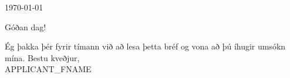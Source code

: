 \documentclass[
    10pt, %
    a4paper, %
    oneside, %
    footinclude, %
    BCOR5mm, %
]{scrartcl}
\title{\normalfont\fontsize{18}{10}\selectfont \spacedlowsmallcaps{LETTER_TITLE}} %
\subtitle{JOB_TITLE\\\vspace{.5em}APPLICANT_FNAME APPLICANT_LNAME\\\href{mailto:APPLICANT_EMAIL}{APPLICANT_EMAIL} } %
\date{} %
\newcommand{\LetterDate}[1]{\noindent#1\par\vspace{2em}}
\newcommand{\Opening}[1]{\justifying #1\par\vspace{0.5em}}
\newcommand{\Closing}[1]{\vspace{0.5em}\justifying#1}
\newcommand{\Sign}[1]{\vspace{2em}\noindent Bestu kveðjur,\\ #1\par\vspace{0.5em}}
\begin{document}
\maketitle

\vspace{-4em}

\LetterDate{\today}
\vspace{-0.8em}
\Opening{Góðan dag!}
\Closing{Ég þakka þér fyrir tímann við að lesa þetta bréf og vona að þú íhugir umsókn mína.}
\Sign{APPLICANT_FNAME}
\end{document}
